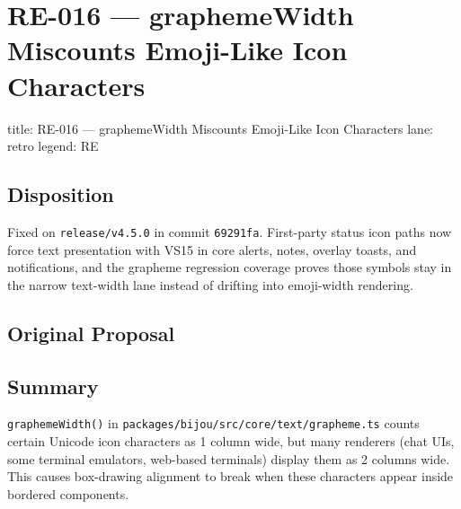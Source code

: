 \chapter{RE-016 --- graphemeWidth Miscounts Emoji-Like Icon Characters}\label{record-402}

\smallskip

\begin{RecordMeta}
title: RE-016 — graphemeWidth Miscounts Emoji-Like Icon Characters
lane: retro
legend: RE

\end{RecordMeta}

\section{Disposition}\label{record-402-disposition}

Fixed on \texttt{r\allowbreak{}e\allowbreak{}l\allowbreak{}e\allowbreak{}a\allowbreak{}s\allowbreak{}e\allowbreak{}/\allowbreak{}v\allowbreak{}4\allowbreak{}.\allowbreak{}5\allowbreak{}.\allowbreak{}0} in commit \texttt{6\allowbreak{}9\allowbreak{}2\allowbreak{}9\allowbreak{}1\allowbreak{}f\allowbreak{}a}. First-party status icon paths now force text presentation with VS15 in core alerts, notes, overlay toasts, and notifications, and the grapheme regression coverage proves those symbols stay in the narrow text-width lane instead of drifting into emoji-width rendering.

\section{Original Proposal}\label{record-402-original-proposal}

\section{Summary}\label{record-402-summary}

\texttt{g\allowbreak{}r\allowbreak{}a\allowbreak{}p\allowbreak{}h\allowbreak{}e\allowbreak{}m\allowbreak{}e\allowbreak{}W\allowbreak{}i\allowbreak{}d\allowbreak{}t\allowbreak{}h\allowbreak{}(\allowbreak{})} in \texttt{p\allowbreak{}a\allowbreak{}c\allowbreak{}k\allowbreak{}a\allowbreak{}g\allowbreak{}e\allowbreak{}s\allowbreak{}/\allowbreak{}b\allowbreak{}i\allowbreak{}j\allowbreak{}o\allowbreak{}u\allowbreak{}/\allowbreak{}s\allowbreak{}r\allowbreak{}c\allowbreak{}/\allowbreak{}c\allowbreak{}o\allowbreak{}r\allowbreak{}e\allowbreak{}/\allowbreak{}t\allowbreak{}e\allowbreak{}x\allowbreak{}t\allowbreak{}/\allowbreak{}g\allowbreak{}r\allowbreak{}a\allowbreak{}p\allowbreak{}h\allowbreak{}e\allowbreak{}m\allowbreak{}e\allowbreak{}.\allowbreak{}t\allowbreak{}s} counts certain Unicode icon characters as 1 column wide, but many renderers (chat UIs, some terminal emulators, web-based terminals) display them as 2 columns wide. This causes box-drawing alignment to break when these characters appear inside bordered components.

